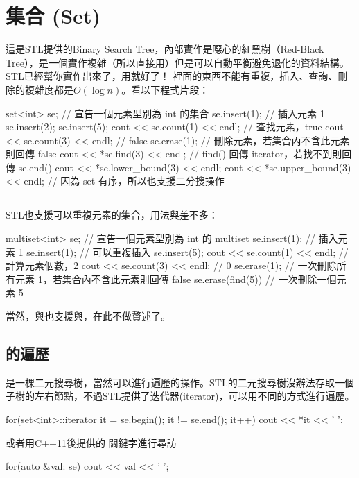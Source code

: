 \section{集合 (Set)}
這是STL提供的Binary Search Tree，內部實作是噁心的紅黑樹（Red-Black Tree），是一個實作複雜（所以直接用）但是可以自動平衡避免退化的資料結構。STL已經幫你實作出來了，用就好了！ 裡面的東西不能有重複，插入、查詢、刪除的複雜度都是$O(\log n)$。看以下程式片段：
\begin{C++}
set<int> se; // 宣告一個元素型別為 int 的集合
se.insert(1); // 插入元素 1
se.insert(2);
se.insert(5);
cout << se.count(1) << endl; // 查找元素，true
cout << se.count(3) << endl; // false
se.erase(1); // 刪除元素，若集合內不含此元素則回傳 false
cout << *se.find(3) << endl;
// find() 回傳 iterator，若找不到則回傳 se.end()
cout << *se.lower_bound(3) << endl;
cout << *se.upper_bound(3) << endl;
// 因為 set 有序，所以也支援二分搜操作
\end{C++}
\subsection{}
STL也支援可以重複元素的集合，用法與差不多：
\begin{C++}
multiset<int> se; // 宣告一個元素型別為 int 的 multiset
se.insert(1); // 插入元素 1
se.insert(1); // 可以重複插入
se.insert(5);
cout << se.count(1) << endl; // 計算元素個數，2
cout << se.count(3) << endl; // 0
se.erase(1); 
// 一次刪除所有元素 1，若集合內不含此元素則回傳 false
se.erase(find(5)) // 一次刪除一個元素 5
\end{C++}
\indent\indent 當然，與也支援與，在此不做贅述了。
\subsection{的遍歷}
是一棵二元搜尋樹，當然可以進行遍歷的操作。STL的二元搜尋樹沒辦法存取一個子樹的左右節點，不過STL提供了迭代器(iterator)，可以用不同的方式進行遍歷。
\begin{C++}
for(set<int>::iterator it = se.begin(); it != se.end(); it++)
    cout << *it << ' ';
\end{C++}
\indent\indent 或者用C++11後提供的  關鍵字進行尋訪
\begin{C++}
for(auto &val: se)
    cout << val << ' ';
\end{C++}
